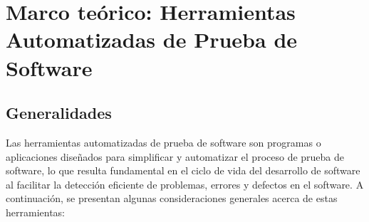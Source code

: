 \documentclass[letterpaper]{article}
\author{Kevin Anthony Rogel Hern[FFFD?]ndez}
\date{2023-10-08}
\begin{document}
\clearpage
\pagestyle{Standard}
\setcounter{page}{1}
\section{Marco teórico: Herramientas Automatizadas de Prueba de Software}
\subsection{Generalidades}
Las herramientas automatizadas de prueba de software son programas o aplicaciones diseñados para simplificar y
automatizar el proceso de prueba de software, lo que resulta fundamental en el ciclo de vida del desarrollo de software
al facilitar la detección eficiente de problemas, errores y defectos en el software. A continuación, se presentan
algunas consideraciones generales acerca de estas herramientas:
\end{document}
